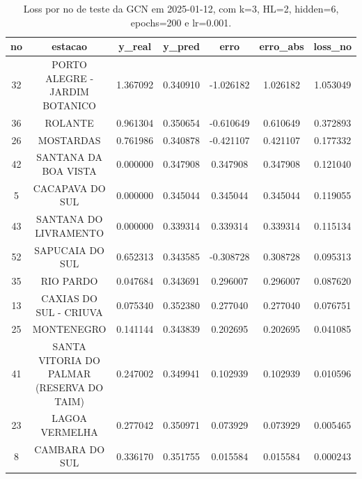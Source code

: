 \begin{table}[h]
\centering
\caption{Loss por no de teste da GCN em 2025-01-12, com k=3, HL=2, hidden=6, epochs=200 e lr=0.001.}
\label{tab:gcn_loss_k3_hl2_h6_e200_d20250112}
\begin{tabular}{ccccccc}
\toprule
no & estacao & y\_real & y\_pred & erro & erro\_abs & loss\_no \\
\midrule
32 & PORTO ALEGRE - JARDIM BOTANICO & 1.367092 & 0.340910 & -1.026182 & 1.026182 & 1.053049 \\
36 & ROLANTE & 0.961304 & 0.350654 & -0.610649 & 0.610649 & 0.372893 \\
26 & MOSTARDAS & 0.761986 & 0.340878 & -0.421107 & 0.421107 & 0.177332 \\
42 & SANTANA DA BOA VISTA & 0.000000 & 0.347908 & 0.347908 & 0.347908 & 0.121040 \\
5 & CACAPAVA DO SUL & 0.000000 & 0.345044 & 0.345044 & 0.345044 & 0.119055 \\
43 & SANTANA DO LIVRAMENTO & 0.000000 & 0.339314 & 0.339314 & 0.339314 & 0.115134 \\
52 & SAPUCAIA DO SUL & 0.652313 & 0.343585 & -0.308728 & 0.308728 & 0.095313 \\
35 & RIO PARDO & 0.047684 & 0.343691 & 0.296007 & 0.296007 & 0.087620 \\
13 & CAXIAS DO SUL - CRIUVA & 0.075340 & 0.352380 & 0.277040 & 0.277040 & 0.076751 \\
25 & MONTENEGRO & 0.141144 & 0.343839 & 0.202695 & 0.202695 & 0.041085 \\
41 & SANTA VITORIA DO PALMAR (RESERVA DO TAIM) & 0.247002 & 0.349941 & 0.102939 & 0.102939 & 0.010596 \\
23 & LAGOA VERMELHA & 0.277042 & 0.350971 & 0.073929 & 0.073929 & 0.005465 \\
8 & CAMBARA DO SUL & 0.336170 & 0.351755 & 0.015584 & 0.015584 & 0.000243 \\
\bottomrule
\end{tabular}
\end{table}
